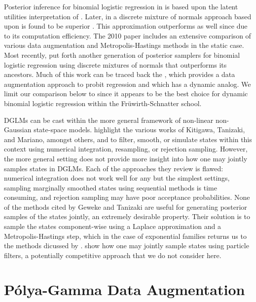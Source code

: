 \documentclass[11pt]{article}
\newcommand{\Polya}{P\'{o}lya}
\begin{document}
Posterior inference for binomial logistic regression in
\cite{fruhwirth-schnatter-fruhwirth-2007} is based upon the latent utilities
interpretation of \cite{mcfadden-1974}.  Later, in a discrete mixture of normals
approach based upon \cite{holmes-held-2006} is found to be superior
\citep{fruhwirth-schnatter-fruhwirth-2010}.  This approximation outperforms
\cite{holmes-held-2006} as well since due to its computation efficiency.  The
2010 paper includes an extensive comparison of various data augmentation and
Metropolis-Hastings methods in the static case.  Most recently,
\cite{fussl-etal-2013} put forth another generation of posterior samplers for
binomial logistic regression using discrete mixtures of normals that outperforms
its ancestors.  Much of this work can be traced back the
\cite{albert-chib-1993}, which provides a data augmentation approach to probit
regression and which has a dynamic analog.  We limit our comparison below to
\cite{fussl-etal-2013} since it appears to be the best choice for dynamic
binomial logistic regression within the Fr\"{u}wirth-Schnatter school.

DGLMs can be cast within the more general framework of non-linear non-Gaussian
state-space models.  \cite{geweke-tanizaki-2001} highlight the various works of
Kitigawa, Tanizaki, and Mariano, amongst others, and to filter, smooth, or
simulate states within this context using numerical integration, resampling, or
rejection sampling.  However, the more general setting does not provide more
insight into how one may jointly samples states in DGLMs.  Each of the
approaches they review is flawed: numerical integration does not work well for
any but the simplest settings, sampling marginally smoothed states using
sequential methods is time consuming, and rejection sampling may have poor
acceptance probabilities.  None of the methods cited by Geweke and Tanizaki are
useful for generating posterior samples of the states jointly, an extremely
desirable property.  Their solution is to sample the states component-wise using
a Laplace approximation and a Metropolis-Hastings step, which in the case of
exponential families returns us to the methods dicussed by
\citep{gamerman-1998}.  \cite{godsill-etal-2004} show how one may jointly sample
states using particle filters, a potentially competitive approach that we do not
consider here.

\section{\Polya-Gamma Data Augmentation}
\end{document}
